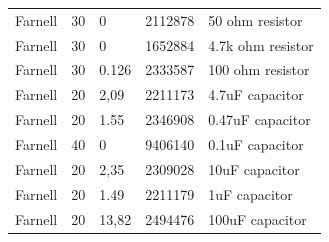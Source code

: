 \begin{table}[]
\begin{tabular}{lllll}
Farnell     & 30     & 0             & 2112878                & 50 ohm resistor             \\
Farnell     & 30     & 0             & 1652884                & 4.7k ohm resistor           \\
Farnell     & 30     & 0.126         & 2333587                & 100 ohm resistor            \\
Farnell     & 20     & 2,09          & 2211173                & 4.7uF capacitor             \\
Farnell     & 20     & 1.55          & 2346908                & 0.47uF capacitor            \\
Farnell     & 40     & 0             & 9406140                & 0.1uF capacitor             \\
Farnell     & 20     & 2,35          & 2309028                & 10uF capacitor              \\
Farnell     & 20     & 1.49          & 2211179                & 1uF capacitor               \\
Farnell     & 20     & 13,82         & 2494476                & 100uF capacitor            
\end{tabular}
\end{table}


